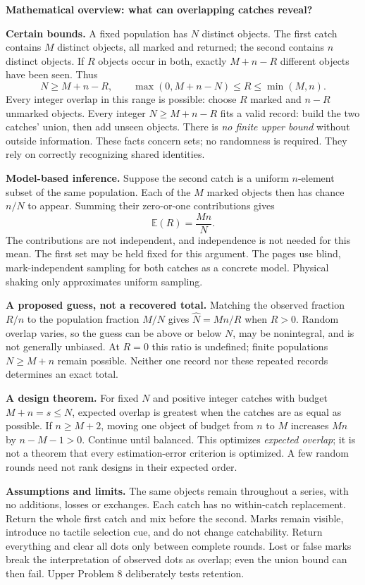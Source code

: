 \documentclass[letterpaper,11pt]{article}
\newcommand{\topic}[1]{\par\medskip\textbf{#1}\par}
\begin{document}
\topic{Mathematical overview: what can overlapping catches reveal?}
\textbf{Certain bounds.} A fixed population has $N$ distinct objects. The first catch contains $M$ distinct objects, all marked and returned; the second contains $n$ distinct objects. If $R$ objects occur in both, exactly $M+n-R$ different objects have been seen. Thus
\[
N\ge M+n-R,\qquad \max(0,M+n-N)\le R\le\min(M,n).
\]
Every integer overlap in this range is possible: choose $R$ marked and $n-R$ unmarked objects. Every integer $N\ge M+n-R$ fits a valid record: build the two catches' union, then add unseen objects. There is \emph{no finite upper bound} without outside information. These facts concern sets; no randomness is required. They rely on correctly recognizing shared identities.

\textbf{Model-based inference.} Suppose the second catch is a uniform $n$-element subset of the same population. Each of the $M$ marked objects then has chance $n/N$ to appear. Summing their zero-or-one contributions gives
\[
\mathbb E(R)=\frac{Mn}{N}.
\]
The contributions are not independent, and independence is not needed for this mean. The first set may be held fixed for this argument. The pages use blind, mark-independent sampling for both catches as a concrete model. Physical shaking only approximates uniform sampling.

\textbf{A proposed guess, not a recovered total.} Matching the observed fraction $R/n$ to the population fraction $M/N$ gives $\widehat N=Mn/R$ when $R>0$. Random overlap varies, so the guess can be above or below $N$, may be nonintegral, and is not generally unbiased. At $R=0$ this ratio is undefined; finite populations $N\ge M+n$ remain possible. Neither one record nor these repeated records determines an exact total.

\textbf{A design theorem.} For fixed $N$ and positive integer catches with budget $M+n=s\le N$, expected overlap is greatest when the catches are as equal as possible. If $n\ge M+2$, moving one object of budget from $n$ to $M$ increases $Mn$ by $n-M-1>0$. Continue until balanced. This optimizes \emph{expected overlap}; it is not a theorem that every estimation-error criterion is optimized. A few random rounds need not rank designs in their expected order.

\textbf{Assumptions and limits.} The same objects remain throughout a series, with no additions, losses or exchanges. Each catch has no within-catch replacement. Return the whole first catch and mix before the second. Marks remain visible, introduce no tactile selection cue, and do not change catchability. Return everything and clear all dots only between complete rounds. Lost or false marks break the interpretation of observed dots as overlap; even the union bound can then fail. Upper Problem 8 deliberately tests retention.
\end{document}
